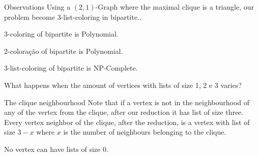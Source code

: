 \documentclass[9pt, compress]{beamer}
\newcommand{\?}{\textcolor{warn}{\textit{?}}}
\begin{document}
     \begin{frame}{Observations}
       Using a $(2,1)$-Graph where the maximal clique is a triangle, our problem become 3-list-coloring in bipartite..
       
       3-coloring of bipartite is Polynomial.
       
       2-coloração of bipartite is Polynomial. 
       
       3-list-coloring of bipartite is NP-Complete.
       
       What happens when the amount of vertices with lists of size 1, 2 e 3 varies? 
     \end{frame}
     \begin{frame}{The clique neighbourhood}
       Note that if a vertex is not in the neighbourhood of any of the vertex from the clique, after our reduction it has list of size three. Every vertex neighbor of the clique, after the reduction, is a vertex with list of size $3-x$ where $x$ is the number of neighbours belonging to the clique.
       
       No vertex can have lists of size 0.
     \end{frame}
\end{document}

